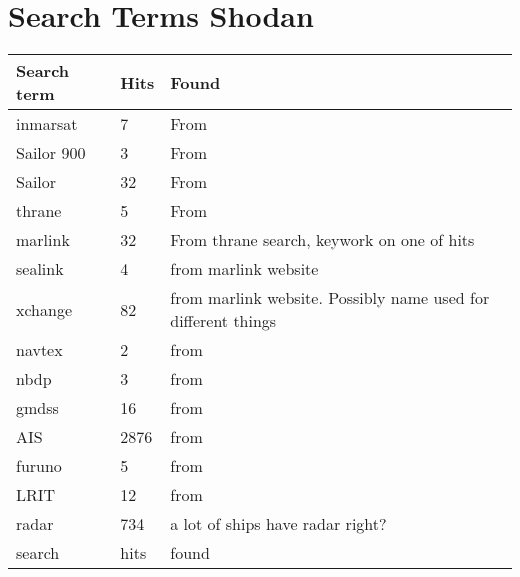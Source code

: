 

\section{Search Terms Shodan} \label{sec:search_term}
\begin{table}
\centering
\begin{tabular}{|l|l|l|}
\hline
Search term & Hits & Found \\ \hline
inmarsat & 7 & From \cite{maritime_pen_test} \\ \hline
Sailor 900 & 3 & From \cite{maritime_pen_test} \\ \hline
Sailor & 32 & From \cite{maritime_pen_test} \\ \hline
thrane & 5 & From \cite{maritime_pen_test} \\ \hline
marlink & 32 &  From thrane search, keywork on one of hits \\ \hline
sealink & 4 &  from marlink website\\ \hline
xchange & 82 &  from marlink website. Possibly name used for different things\\ \hline
navtex & 2 &  from \cite{maritime_digitalization}\\ \hline
nbdp & 3 &  from \cite{maritime_digitalization}\\ \hline
gmdss & 16 &  from \cite{maritime_digitalization}\\ \hline
AIS & 2876 &  from \cite{maritime_digitalization}\\ \hline
furuno & 5 &  from \cite{maritime_digitalization}\\ \hline
LRIT & 12 &  from \cite{maritime_digitalization}\\ \hline
radar & 734 &  a lot of ships have radar right?\\ \hline
search & hits &  found\\ \hline
\end{tabular}
\end{table}